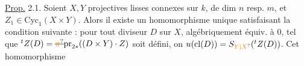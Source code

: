 
\uline{Prop.} 2.1. Soient $X,Y$ projectives lisses connexes sur $k$, de dim $n$ resp. $m$, et  $Z_1\in\mathrm{Cyc}_1(X\times Y)$. Alors il existe un homomorphisme
unique
satisfaisant la condition suivante : pour tout diviseur $D$ sur $X$, algébriquement équiv. à $0$, tel que $ {}^{t}Z(D)=\deleted{\unsure{\pi}}\mathrm{pr}_{2*}((D\times Y)\cdot Z)$ soit défini, on  $u(\mathrm{cl}(D))=S_{\unsure{Y|X}}({}^{t}Z(D))$. Cet homomorphisme
